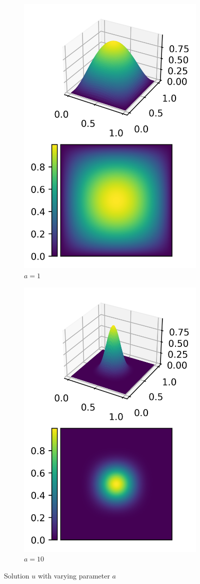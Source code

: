 \documentclass[11pt,a4paper]{article}
\begin{document}
\begin{figure}
  \centering
  \begin{subfigure}{.5\textwidth}
    \centering
    \includegraphics[width=.6\linewidth]{contour_1}
    \caption{$a = 1$}
  \end{subfigure}%
  \begin{subfigure}{.5\textwidth}
    \centering
    \includegraphics[width=.6\linewidth]{contour_10}
    \caption{$a = 10$}
  \end{subfigure}
  \caption{Solution $u$ with varying parameter $a$}
  \label{fig:smooth_dirichlet_solution}
\end{figure}
\end{document}
